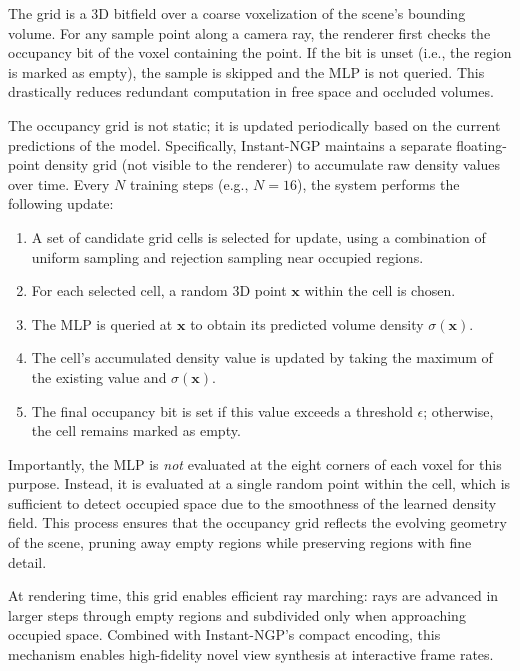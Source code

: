\begin{enrichment}
\begin{enrichment}
    \medskip
    The grid is a 3D bitfield over a coarse voxelization of the scene’s bounding volume. For any sample point along a camera ray, the renderer first checks the occupancy bit of the voxel containing the point. If the bit is unset (i.e., the region is marked as empty), the sample is skipped and the MLP is not queried. This drastically reduces redundant computation in free space and occluded volumes.
    
    \medskip
    The occupancy grid is not static; it is updated periodically based on the current predictions of the model. Specifically, Instant-NGP maintains a separate floating-point density grid (not visible to the renderer) to accumulate raw density values over time. Every \( N \) training steps (e.g., \( N = 16 \)), the system performs the following update:
    
    \begin{enumerate}
        \item A set of candidate grid cells is selected for update, using a combination of uniform sampling and rejection sampling near occupied regions.
        \item For each selected cell, a random 3D point \( \mathbf{x} \) within the cell is chosen.
        \item The MLP is queried at \( \mathbf{x} \) to obtain its predicted volume density \( \sigma(\mathbf{x}) \).
        \item The cell’s accumulated density value is updated by taking the maximum of the existing value and \( \sigma(\mathbf{x}) \).
        \item The final occupancy bit is set if this value exceeds a threshold \( \epsilon \); otherwise, the cell remains marked as empty.
    \end{enumerate}
    
    Importantly, the MLP is \emph{not} evaluated at the eight corners of each voxel for this purpose. Instead, it is evaluated at a single random point within the cell, which is sufficient to detect occupied space due to the smoothness of the learned density field. This process ensures that the occupancy grid reflects the evolving geometry of the scene, pruning away empty regions while preserving regions with fine detail.
    
    \medskip
    At rendering time, this grid enables efficient ray marching: rays are advanced in larger steps through empty regions and subdivided only when approaching occupied space. Combined with Instant-NGP’s compact encoding, this mechanism enables high-fidelity novel view synthesis at interactive frame rates.
    

\end{enrichment}
\end{enrichment}
